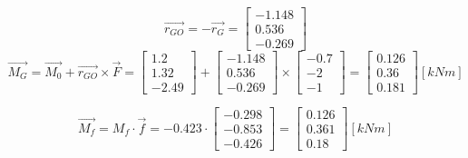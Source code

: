 $$\vec{r_{GO}} = -\vec{r_G} = \begin{bmatrix} -1.148 \\ 0.536 \\ -0.269 \end{bmatrix}$$
$$\vec{M_G} = \vec{M_0} + \vec{r_{GO}} \times \vec{F} = \begin{bmatrix} 1.2 \\ 1.32 \\ -2.49 \end{bmatrix} + \begin{bmatrix} -1.148 \\ 0.536 \\ -0.269 \end{bmatrix} \times \begin{bmatrix} -0.7 \\ -2 \\ -1 \end{bmatrix} = \begin{bmatrix} 0.126 \\ 0.36 \\ 0.181 \end{bmatrix} [\si{kNm}]$$

\begin{center}
\end{center}

$$\vec{M_f} = M_f \cdot \vec{f} = -0.423 \cdot \begin{bmatrix} -0.298 \\ -0.853 \\ -0.426 \end{bmatrix} = \begin{bmatrix} 0.126 \\ 0.361 \\ 0.18 \end{bmatrix} [\si{kNm}]$$

